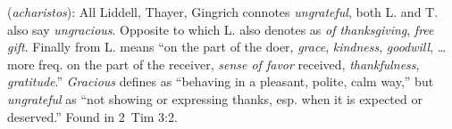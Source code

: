 \item[Ungrateful,]

(\textit{acharistos}):
All Liddell, Thayer, Gingrich connotes \emph{ungrateful}, both L. and T. also say \emph{ungracious}. Opposite to  which L. also denotes as \emph{of thanksgiving}, \emph{free gift}. Finally  from L. means ``on the part of the doer, \emph{grace}, \emph{kindness}, \emph{goodwill}, \ldots more freq. on the part of the receiver, \emph{sense of favor} received, \emph{thankfulness}, \emph{gratitude}.'' 
\emph{Gracious} defines as ``behaving in a pleasant, polite, calm way,'' but \emph{ungrateful} as ``not showing or expressing thanks, esp. when it is expected or deserved.''
Found in 2~Tim 3:2.
